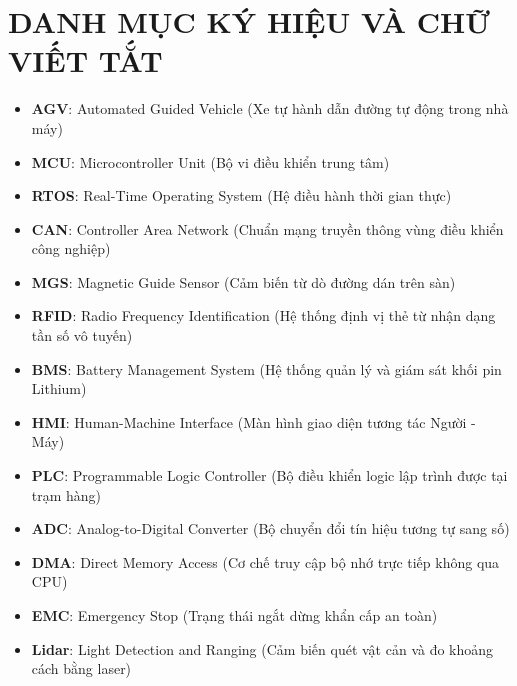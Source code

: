 \section*{DANH MỤC KÝ HIỆU VÀ CHỮ VIẾT TẮT}

\begin{itemize}
    \item \textbf{AGV}: Automated Guided Vehicle (Xe tự hành dẫn đường tự động trong nhà máy)
    \item \textbf{MCU}: Microcontroller Unit (Bộ vi điều khiển trung tâm)
    \item \textbf{RTOS}: Real-Time Operating System (Hệ điều hành thời gian thực)
    \item \textbf{CAN}: Controller Area Network (Chuẩn mạng truyền thông vùng điều khiển công nghiệp)
    \item \textbf{MGS}: Magnetic Guide Sensor (Cảm biến từ dò đường dán trên sàn)
    \item \textbf{RFID}: Radio Frequency Identification (Hệ thống định vị thẻ từ nhận dạng tần số vô tuyến)
    \item \textbf{BMS}: Battery Management System (Hệ thống quản lý và giám sát khối pin Lithium)
    \item \textbf{HMI}: Human-Machine Interface (Màn hình giao diện tương tác Người - Máy)
    \item \textbf{PLC}: Programmable Logic Controller (Bộ điều khiển logic lập trình được tại trạm hàng)
    \item \textbf{ADC}: Analog-to-Digital Converter (Bộ chuyển đổi tín hiệu tương tự sang số)
    \item \textbf{DMA}: Direct Memory Access (Cơ chế truy cập bộ nhớ trực tiếp không qua CPU)
    \item \textbf{EMC}: Emergency Stop (Trạng thái ngắt dừng khẩn cấp an toàn)
    \item \textbf{Lidar}: Light Detection and Ranging (Cảm biến quét vật cản và đo khoảng cách bằng laser)
\end{itemize}
